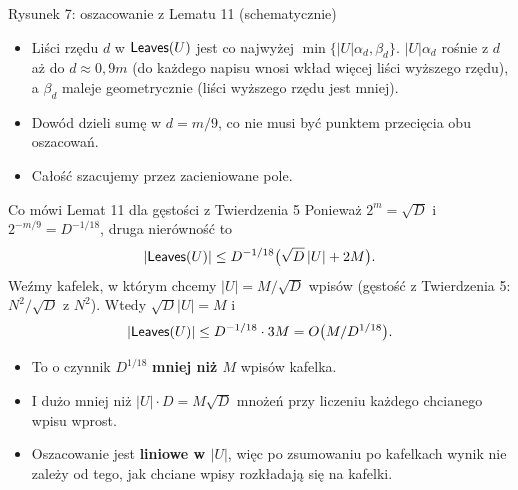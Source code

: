 \begin{frame}{Rysunek 7: oszacowanie z Lematu 11 (schematycznie)}
  \centering

  \vspace{0.4em}
  \begin{itemize}\small
    \item Liści rzędu $d$ w $\mathsf{Leaves}(U)$ jest co najwyżej $\min\{|U|\alpha_d,\beta_d\}$.
      $|U|\alpha_d$ rośnie z $d$ aż do $d\approx0{,}9m$ (do każdego napisu wnosi wkład więcej liści wyższego rzędu),
      a $\beta_d$ maleje geometrycznie (liści wyższego rzędu jest mniej).
    \item<2-> Dowód dzieli sumę w $d=m/9$, co nie musi być punktem przecięcia obu oszacowań.
    \item<3-> Całość szacujemy przez zacieniowane pole.
  \end{itemize}
\end{frame}

\begin{frame}{Co mówi Lemat 11 dla gęstości z Twierdzenia 5}
  Ponieważ $2^m=\sqrt D$ i $2^{-m/9}=D^{-1/18}$, druga nierówność to
  \[
    |\mathsf{Leaves}(U)|\le D^{-1/18}\big(\sqrt D\,|U|+2M\big).
  \]
  \pause
  Weźmy kafelek, w którym chcemy $|U|=M/\sqrt D$ wpisów (gęstość z Twierdzenia 5: $N^2/\sqrt D$ z $N^2$). Wtedy $\sqrt D|U|=M$ i
  \[
    |\mathsf{Leaves}(U)|\le D^{-1/18}\cdot3M=O\big(M/D^{1/18}\big).
  \]
  \pause
  \begin{itemize}
    \item To o czynnik $D^{1/18}$ \textbf{mniej niż $M$} wpisów kafelka.
    \item I dużo mniej niż $|U|\cdot D=M\sqrt D$ mnożeń przy liczeniu każdego chcianego wpisu wprost.
    \item<4-> Oszacowanie jest \textbf{liniowe w $|U|$}, więc po zsumowaniu po kafelkach wynik nie zależy od tego, jak chciane wpisy
      rozkładają się na kafelki.
  \end{itemize}
\end{frame}
